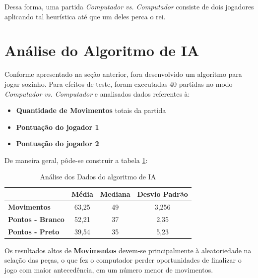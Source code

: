 	Dessa forma, uma partida \textit{Computador vs. Computador} consiste de dois jogadores aplicando tal heurística até que um deles perca o rei.

	\section{Análise do Algoritmo de IA}

	Conforme apresentado na seção anterior, fora desenvolvido um algoritmo para jogar sozinho. Para efeitos de teste, foram executadas
	$40$ partidas no modo \textit{Computador vs. Computador} e analisados dados referentes à:
	\begin{itemize}
		\item \textbf{Quantidade de Movimentos} totais da partida
		\item \textbf{Pontuação do jogador 1}
		\item \textbf{Pontuação do jogador 2}
	\end{itemize}
%
De maneira geral, pôde-se construir a tabela \ref{my-label}:
\begin{table}[]
\centering
\label{my-label}
\begin{tabular}{|l|c|c|c|}
\hline
                         & \textbf{Média} & \textbf{Mediana} & \textbf{Desvio Padrão} \\ \hline
\textbf{Movimentos}      & 63,25          & 49               & 3,256                  \\ \hline
\textbf{Pontos - Branco} & 52,21          & 37               & 2,35                   \\ \hline
\textbf{Pontos - Preto}  & 39,54          & 35               & 5,23                   \\ \hline
\end{tabular}
\caption{Análise dos Dados do algoritmo de IA}
\end{table}

Os resultados altos de \textbf{Movimentos} devem-se principalmente à aleatoriedade na selação das peças, o que
fez o computador perder oportunidades de finalizar o jogo com maior antecedência, em um número menor de movimentos.

	\newpage
	
	


